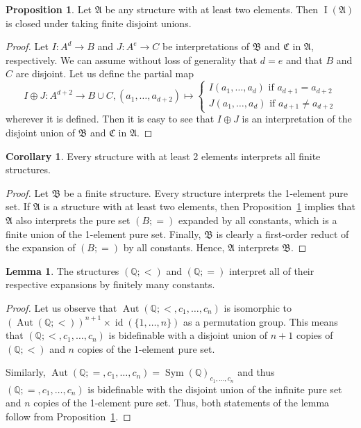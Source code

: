 \documentclass{amsart}
\theoremstyle{definition}
\newtheorem{lemma}[theorem]{Lemma}
\newtheorem{corollary}[theorem]{Corollary}
\newtheorem{proposition}[theorem]{Proposition}
\theoremstyle{remark}
\numberwithin{equation}{section}
\DeclareMathOperator{\I}{\operatorname{I}}
\newcommand{\aut}{\operatorname{Aut}}
\newcommand{\sym}{\operatorname{Sym}}
\newcommand{\id}{\operatorname{id}}
\newcommand{\atoms}{({\mathbb Q};=)}
\newcommand{\order}{(\mathbb{Q};<)}
\newcommand{\fa}{\mathfrak{A}}
\newcommand{\fb}{\mathfrak{B}}
\newcommand{\fc}{\mathfrak{C}}
\begin{document}
	
\begin{proposition}\label{disjoint_unions}
	Let $\fa$ be any structure with at least two elements. Then $\I(\fa)$ is closed under taking finite disjoint unions.
\end{proposition}

\begin{proof}
	Let $I \colon A^d\rightarrow B$ and $J \colon A^e\rightarrow C$ be interpretations of $\fb$ and $\fc$ in $\fa$, respectively. We can assume without loss of generality that $d=e$ and that $B$ and $C$ are disjoint.
	Let us define the partial map
$$
I\oplus J \colon  A^{d+2}\rightarrow B\cup C, (a_1,\dots,a_{d+2})\mapsto
\begin{cases*}
I(a_1,\dots,a_d) \text{ if $a_{d+1}=a_{d+2}$}\\
J(a_1,\dots,a_d) \text{ if $a_{d+1}\neq a_{d+2}$}
\end{cases*} 
$$
	wherever it is defined. Then it is easy to see that $I\oplus J$ is an interpretation of the disjoint union of $\fb$ and $\fc$ in $\fa$.
\end{proof}

\begin{corollary}\label{inter_finite}
	Every structure with at least 2 elements interprets all finite structures. 
\end{corollary}

\begin{proof}
    	Let $\fb$ be a finite structure. 
	Every structure interprets the 1-element pure set. 
    If $\fa$ is a structure with at least two elements, then Proposition~\ref{disjoint_unions}  implies that $\fa$ also interprets the pure set $(B;=)$ expanded by all constants, which is a finite union of the 1-element pure set. Finally, $\fb$ is clearly a first-order reduct of the expansion of $(B;=)$ by all constants. Hence, $\fa$ interprets $\fb$.  
\end{proof}
	
\begin{lemma}\label{q_add_constants}
	The structures $\order$ and $\atoms$ interpret all of their respective expansions by finitely many constants.
\end{lemma}

\begin{proof}
	Let us observe that $\aut(\mathbb{Q};<,c_1,\dots,c_n)$ is isomorphic to $(\aut\order)^{n+1}\times \id(\{1,\dots,n\})$ as a permutation group. This means that $(\mathbb{Q};<,c_1,\dots,c_n)$ is bidefinable with a disjoint union of $n+1$ copies of $\order$ and $n$ copies of the 1-element pure set. 
	
	Similarly, $\aut(\mathbb{Q};=,c_1,\dots,c_n)=\sym(\mathbb{Q})_{c_1,\dots,c_n}$ and thus $(\mathbb{Q};=,c_1,\dots,c_n)$ is bidefinable with the disjoint union of the infinite pure set and $n$ copies of the 1-element pure set. Thus, both statements of the lemma follow from Proposition~\ref{disjoint_unions}.
\end{proof}
\end{document}
